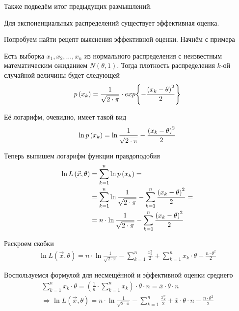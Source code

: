 Также подведём итог предыдущих размышлений.

\begin{affirmation}
  \label{affirmation:efficientEstimator:exponentialExsistance}
  Для экспоненциальных распределений существует эффективная оценка.
\end{affirmation}

Попробуем найти рецепт выяснения эффективной оценки. Начнём с примера
\begin{example}
  Есть выборка $x_1, x_2, \dots, x_n$ из нормального распределения
  с неизвестным математическим ожиданием $N\left( \theta,1 \right)$.
  Тогда плотность распределения $k$-ой случайной величины будет следующей
  $$p\left(x_k\right)
    =\frac{1}{\sqrt{2\cdot\pi}}
      \cdot exp{\left\{-\frac{\left(x_k-\theta\right)^2}{2}\right\}}$$

  Её логарифм, очевидно, имеет такой вид
  $$\ln{p\left(x_k\right)}
    =\ln{\frac{1}{\sqrt{2\cdot\pi}}}
      -\frac{\left(x_k-\theta\right)^2}{2}$$

  Теперь выпишем логарифм функции правдоподобия
  \begin{align*}
    \ln{L\left( \vec{x},\theta \right)}
    &=\sum_{k=1}^n \ln{p\left(x_k\right)}=\\
    &=\sum_{k=1}^n \ln{\frac{1}{\sqrt{2\cdot\pi}}}
      -\sum_{k=1}^n \frac{\left(x_k-\theta\right)^2}{2}=\\
    &=n\cdot\ln{\frac{1}{\sqrt{2\cdot\pi}}}
      -\sum_{k=1}^n \frac{\left(x_k-\theta\right)^2}{2}
  \end{align*}

  Раскроем скобки
  \begin{align*}
    \ln{L\left( \vec{x},\theta \right)}
    =n\cdot\ln{\frac{1}{\sqrt{2\cdot\pi}}}
      -\sum_{k=1}^n \frac{x_k^2}{2}
      +\sum_{k=1}^n x_k\cdot\theta
      -\frac{n\cdot\theta^2}{2}
  \end{align*}

  Воспользуемся формулой для несмещённой и эффективной оценки среднего
  \begin{align*}
    \sum_{k=1}^n x_k\cdot\theta
      =\left( \frac{1}{n}\cdot\sum_{k=1}^n x_k \right) \cdot\theta\cdot n
      =\overline{x}\cdot\theta\cdot n\\
    \Rightarrow\ln{L\left( \vec{x},\theta \right)}
    =n\cdot\ln{\frac{1}{\sqrt{2\cdot\pi}}}
      -\sum_{k=1}^n \frac{x_k^2}{2}
      +\overline{x}\cdot\theta\cdot n
      -\frac{n\cdot\theta^2}{2}
  \end{align*}


\end{example}
